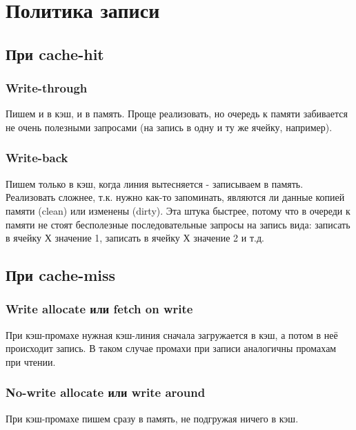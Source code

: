 \documentclass[12pt, a4paper]{article}
\begin{document}
\section{Политика записи}
\subsection{При cache-hit}
\subsubsection{Write-through}
Пишем и в кэш, и в память. Проще реализовать, но очередь к памяти забивается не очень полезными запросами (на запись в одну и ту же ячейку, например).
\subsubsection{Write-back}
Пишем только в кэш, когда линия вытесняется - записываем в память. Реализовать сложнее, т.к. нужно как-то запоминать, являются ли данные копией памяти (clean) или изменены (dirty). Эта штука быстрее, потому что в очереди к памяти не стоят бесполезные последовательные запросы на запись вида: записать в ячейку Х значение 1, записать в ячейку Х значение 2 и т.д.
\subsection{При cache-miss}
\subsubsection{Write allocate или fetch on write}
При кэш-промахе нужная кэш-линия сначала загружается в кэш, а потом в неё происходит запись. В таком случае промахи при записи аналогичны промахам при чтении.
\subsubsection{No-write allocate или write around}
При кэш-промахе пишем сразу в память, не подгружая ничего в кэш.
\end{document}
